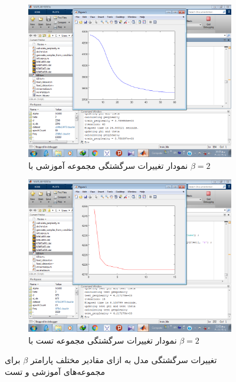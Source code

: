 \documentclass[11.5pt,a4paper]{article}
\begin{document}
\begin{figure}[h]
	\begin{subfigure}{.45\textwidth}
		\includegraphics[scale=0.25]{Imgs/k3_b2_a003_25s_ptr3758397.png}
		\caption{نمودار تغییرات سرگشتگی مجموعه‌ آموزشی با $\beta = 2$}
	\end{subfigure}
	\begin{subfigure}{.45\textwidth}
		\includegraphics[scale=0.25]{Imgs/k3_b2_a003_8s_pts4217278.png}
		\caption{نمودار تغییرات سرگشتگی مجموعه‌ تست با $\beta = 2$}
	\end{subfigure}
\caption{تغییرات سرگشتگی مدل به ازای مقادیر مختلف پارامتر $\beta$ برای مجموعه‌های آموزشی و تست
}
\label{fig:beta}
\end{figure} 
\end{document}
